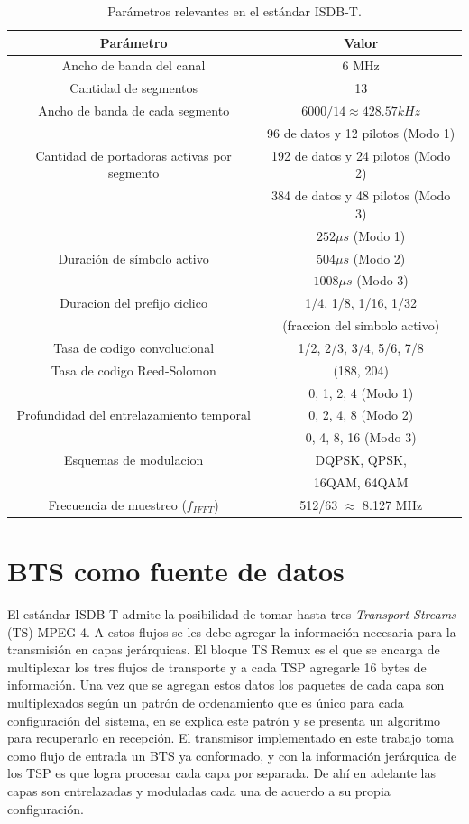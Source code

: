 \begin{table}[h!]
\centering
\begin{tabular}{|c|c|}
\hline
\textbf{Parámetro} 				& \textbf{Valor}\\
\hline
Ancho de banda del canal 		& 6 MHz\\
\hline
Cantidad de segmentos 			& 13 \\
\hline
Ancho de banda de cada segmento & $6000/14 \approx 428.57kHz$ \\
\hline
  											& 96 de datos y 12 pilotos (Modo 1) \\
Cantidad de portadoras activas por segmento & 192 de datos y 24 pilotos (Modo 2) \\
 											& 384 de datos y 48 pilotos (Modo 3)\\
\hline
 								& $252 \mu s$ (Modo 1)\\
Duración de símbolo activo 		& $504 \mu s$ (Modo 2) \\
								& $1008 \mu s$ (Modo 3) \\
\hline
Duracion del prefijo ciclico 	& 1/4, 1/8, 1/16, 1/32 \\
 								& (fraccion del simbolo activo)\\
\hline
Tasa de codigo convolucional 	& 1/2, 2/3, 3/4, 5/6, 7/8\\
\hline
Tasa de codigo Reed-Solomon 	& (188, 204) \\
\hline
 								& 0, 1, 2, 4 (Modo 1) \\
Profundidad del entrelazamiento temporal & 0, 2, 4, 8 (Modo 2) \\
 & 0, 4, 8, 16 (Modo 3)\\
\hline
Esquemas de modulacion & DQPSK, QPSK,\\
 & 16QAM, 64QAM\\
 \hline
 Frecuencia de muestreo ($f_{IFFT}$) & 512/63 $\approx$ 8.127 MHz\\
 \hline
\end{tabular}
\caption{\label{parametros_ISDBT} Par\'ametros relevantes en el est\'andar ISDB-T.}
\end{table}

\section{BTS como fuente de datos}

El est\'andar ISDB-T admite la posibilidad de tomar hasta tres \textit{Transport Streams} (TS) MPEG-4. A estos flujos se les debe agregar la informaci\'on necesaria para la transmisi\'on en capas jer\'arquicas. El bloque TS Remux es el que se encarga de multiplexar los tres flujos de transporte y a cada TSP agregarle 16 bytes de informaci\'on. 
Una vez que se agregan estos datos los paquetes de cada capa son multiplexados seg\'un un patr\'on de ordenamiento que es \'unico para cada configuraci\'on del sistema, en \cite{multiplex-pattern} se explica este patr\'on y se presenta un algoritmo para recuperarlo en recepci\'on. El transmisor implementado en este trabajo toma como flujo de entrada un BTS ya conformado, y con la informaci\'on jer\'arquica de los TSP es que logra procesar cada capa por separada. De ah\'i en adelante las capas son entrelazadas y moduladas cada una de acuerdo a su propia configuraci\'on. 

